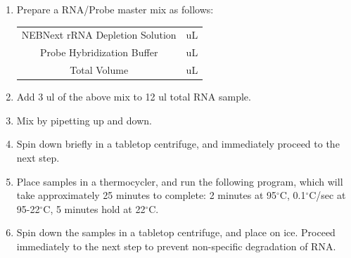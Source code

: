 \documentclass[11pt, oneside]{article}
\begin{document}
		\begin{enumerate}
			\item Prepare a RNA/Probe master mix as follows:
			
			\begin{table}[h]
				\centering
				\begin{tabular}{| c | >{\centering\arraybackslash}m{10em} |}
				\hline
				\cellcolor{gray}{\bf Reagent} & \cellcolor{gray}{\bf Number of samples 1X (uL)}  \\
				\hline
				NEBNext rRNA Depletion Solution & 1 uL \\
				Probe Hybridization Buffer & 2 uL \\
				\hline
				Total Volume & 3 uL \\
				\hline
				\end{tabular}
			\end{table}
		
			\item Add 3 ul of the above mix to 12 ul total RNA sample. 
			\item Mix by pipetting up and down. 
			\item Spin down briefly in a tabletop centrifuge, and immediately proceed to the next step. 
			\item Place samples in a thermocycler, and run the following program, which will take approximately 25 minutes to complete: 2 minutes at 			95$^{\circ}$C, 0.1$^{\circ}$C/sec at 95-22$^{\circ}$C, 5 minutes hold at 22$^{\circ}$C.	
			\item Spin down the samples in a tabletop centrifuge, and place on ice. Proceed immediately to the next step to prevent non-specific 				degradation of RNA. 		
		\end{enumerate}
		
		\vspace{3mm}
		
		
\end{document}
